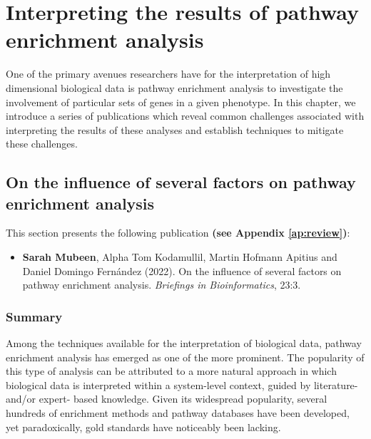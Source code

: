 \chapter{Interpreting the results of pathway enrichment analysis}

\label{ch:pathways}

One of the primary avenues researchers have for the interpretation of high dimensional biological data is pathway enrichment analysis to investigate the involvement of particular sets of genes in a given phenotype. In this chapter, we introduce a series of publications which reveal common challenges associated with interpreting the results of these analyses and establish techniques to mitigate these challenges.

\section{On the influence of several factors on pathway enrichment analysis}

\label{ch:review}

This section presents the following publication \textbf{(see Appendix \ref{ap:review})}:

\begin{itemize}

\item[] \textbf{Sarah Mubeen}, Alpha Tom Kodamullil, Martin Hofmann Apitius and Daniel Domingo Fernández (2022). On the influence of several factors on pathway enrichment analysis. \textit{Briefings in Bioinformatics}, 23:3.

\end{itemize}

\subsection*{Summary}

Among the techniques available for the interpretation of biological data, pathway enrichment analysis has emerged as one of the more prominent. The popularity of this type of analysis can be attributed to a more natural approach in which biological data is interpreted within a system-level context, guided by literature- and/or expert- based knowledge. Given its widespread popularity, several hundreds of enrichment methods and pathway databases have been developed, yet paradoxically, gold standards have noticeably been lacking. 

